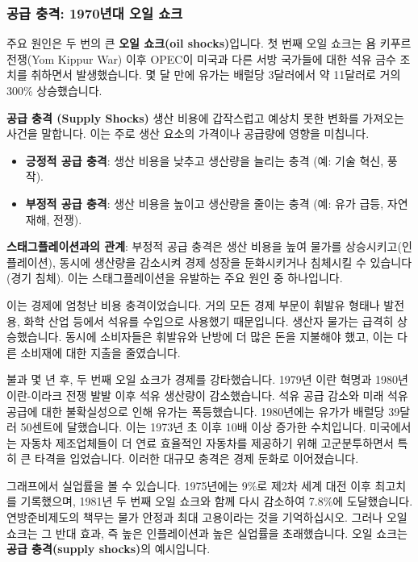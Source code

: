 \documentclass[11pt,a4paper]{article}
\theoremstyle{definition}
\begin{document}
\subsubsection*{공급 충격: 1970년대 오일 쇼크}

주요 원인은 두 번의 큰 \textbf{오일 쇼크(oil shocks)}입니다. 첫 번째 오일 쇼크는 욤 키푸르 전쟁(Yom Kippur War) 이후 OPEC이 미국과 다른 서방 국가들에 대한 석유 금수 조치를 취하면서 발생했습니다. 몇 달 만에 유가는 배럴당 3달러에서 약 11달러로 거의 300\% 상승했습니다.

\begin{conceptbox}
\textbf{공급 충격 (Supply Shocks)}
생산 비용에 갑작스럽고 예상치 못한 변화를 가져오는 사건을 말합니다. 이는 주로 생산 요소의 가격이나 공급량에 영향을 미칩니다.
\begin{itemize}
    \item \textbf{긍정적 공급 충격}: 생산 비용을 낮추고 생산량을 늘리는 충격 (예: 기술 혁신, 풍작).
    \item \textbf{부정적 공급 충격}: 생산 비용을 높이고 생산량을 줄이는 충격 (예: 유가 급등, 자연재해, 전쟁).
\end{itemize}
\textbf{스태그플레이션과의 관계}: 부정적 공급 충격은 생산 비용을 높여 물가를 상승시키고(인플레이션), 동시에 생산량을 감소시켜 경제 성장을 둔화시키거나 침체시킬 수 있습니다(경기 침체). 이는 스태그플레이션을 유발하는 주요 원인 중 하나입니다.
\end{conceptbox}

이는 경제에 엄청난 비용 충격이었습니다. 거의 모든 경제 부문이 휘발유 형태나 발전용, 화학 산업 등에서 석유를 수입으로 사용했기 때문입니다. 생산자 물가는 급격히 상승했습니다. 동시에 소비자들은 휘발유와 난방에 더 많은 돈을 지불해야 했고, 이는 다른 소비재에 대한 지출을 줄였습니다.

불과 몇 년 후, 두 번째 오일 쇼크가 경제를 강타했습니다. 1979년 이란 혁명과 1980년 이란-이라크 전쟁 발발 이후 석유 생산량이 감소했습니다. 석유 공급 감소와 미래 석유 공급에 대한 불확실성으로 인해 유가는 폭등했습니다. 1980년에는 유가가 배럴당 39달러 50센트에 달했습니다. 이는 1973년 초 이후 10배 이상 증가한 수치입니다. 미국에서는 자동차 제조업체들이 더 연료 효율적인 자동차를 제공하기 위해 고군분투하면서 특히 큰 타격을 입었습니다. 이러한 대규모 충격은 경제 둔화로 이어졌습니다.

그래프에서 실업률을 볼 수 있습니다. 1975년에는 9\%로 제2차 세계 대전 이후 최고치를 기록했으며, 1981년 두 번째 오일 쇼크와 함께 다시 감소하여 7.8\%에 도달했습니다. 연방준비제도의 책무는 물가 안정과 최대 고용이라는 것을 기억하십시오. 그러나 오일 쇼크는 그 반대 효과, 즉 높은 인플레이션과 높은 실업률을 초래했습니다. 오일 쇼크는 \textbf{공급 충격(supply shocks)}의 예시입니다.
\end{document}
